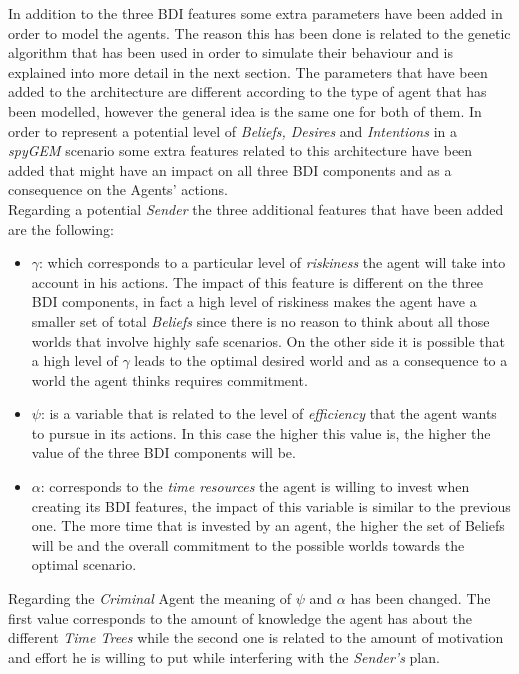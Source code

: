 \documentclass[a4paper]{article}
\begin{document}
In addition to the three BDI features some extra parameters have been added in order to model the agents. The reason this has been done is related to the genetic algorithm that has been used in order to simulate their behaviour and is explained into more detail in the next section. The parameters that have been added to the architecture are different according to the type of agent that has been modelled, however the general idea is the same one for both of them. In order to represent a potential level of \textit{Beliefs, Desires} and \textit{Intentions} in a \textit{spyGEM} scenario some extra features related to this architecture have been added that might have an impact on all three BDI components and as a consequence on the Agents' actions. \\
Regarding a potential \textit{Sender} the three additional features that have been added are the following:
\begin{itemize}
\item $\gamma$: which corresponds to a particular level of \textit{riskiness} the agent will take into account in his actions. The impact of this feature is different on the three BDI components, in fact a high level of riskiness makes the agent have a smaller set of total \textit{Beliefs} since there is no reason to think about all those worlds that involve highly safe scenarios. On the other side it is possible that a high level of $\gamma$ leads to the optimal desired world and as a consequence to a world the agent thinks requires commitment.  
\item $\psi$: is a variable that is related to the level of \textit{efficiency} that the agent wants to pursue in its actions. In this case the higher this value is, the higher the value of the three BDI components will be. 
\item $\alpha$: corresponds to the \textit{time resources} the agent is willing to invest when creating its BDI features, the impact of this variable is similar to the previous one. The more time that is invested by an agent, the higher the set of Beliefs will be and the overall commitment to the possible worlds towards the optimal scenario.
\end{itemize}

Regarding the \textit{Criminal} Agent the meaning of $\psi$ and $\alpha$ has been changed. The first value corresponds to the amount of knowledge the agent has about the different \textit{Time Trees} while the second one is related to the amount of motivation and effort he is willing to put while interfering with the \textit{Sender's} plan. \\
    
\end{document}
